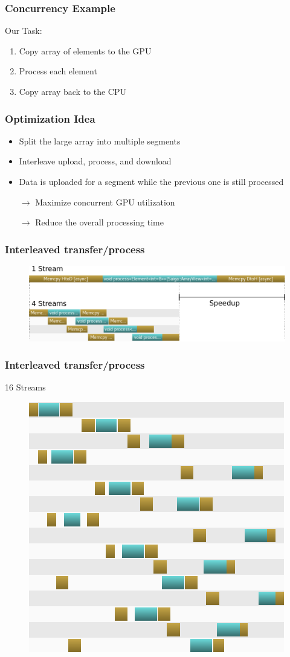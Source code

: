 \documentclass[aspectratio=169,handout]{beamer}
\begin{document}
\begin{frame}[fragile]
\frametitle{Concurrency Example}
Our Task:
\begin{enumerate}
	\item Copy array of elements to the GPU
	\item Process each element
	\item Copy array back to the CPU
\end{enumerate}
\end{frame}


\begin{frame}[fragile]
\frametitle{Optimization Idea}
\begin{itemize}
	\item Split the large array into multiple segments
	\item Interleave upload, process, and download
	\item Data is uploaded for a segment while the previous one is still processed
	\item[$\rightarrow$] Maximize concurrent GPU utilization
	\item[$\rightarrow$] Reduce the overall processing time
\end{itemize}
\end{frame}

\begin{frame}[fragile]
\frametitle{Interleaved transfer/process}

\begin{figure}
	\includegraphics[width=1\linewidth]{asyncspeedup}
\end{figure}

\end{frame}

\begin{frame}[fragile]
\frametitle{Interleaved transfer/process}
16 Streams
\begin{figure}
	\includegraphics[width=.4\linewidth]{async16}
\end{figure}

\end{frame}
\end{document}
